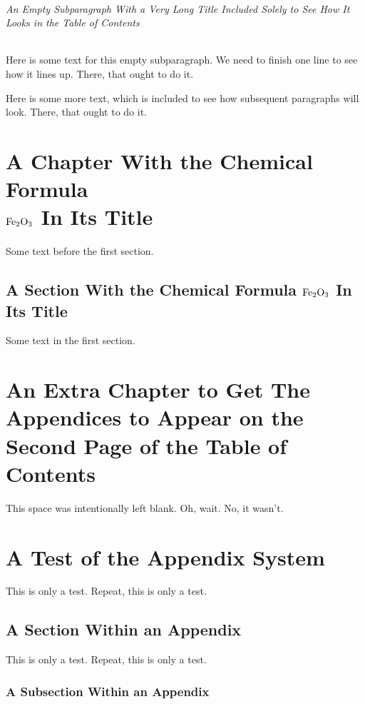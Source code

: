 \documentclass{article}
\begin{document}
\subparagraph{An Empty Subparagraph With a Very Long Title Included Solely to See How It Looks in the Table of Contents}

Here is some text for this empty subparagraph.  We need to finish one line to see how it lines up.  There, that ought to do it.

Here is some more text, which is included to see how subsequent paragraphs will look.  There, that ought to do it.


\chapter{A Chapter With the Chemical Formula%
	\texorpdfstring{\\ $\rm Fe_2 O_3$}{Fe2O3} In Its Title}

Some text before the first section.

\section{A Section With the Chemical Formula 	\texorpdfstring{$\rm Fe_2 O_3$}{Fe2O3} In Its Title}

Some text in the first section.


\chapter{An Extra Chapter to Get The Appendices to Appear on the Second Page of the Table of Contents}

This space was intentionally left blank.  Oh, wait.  No, it wasn't.






\chapter{A Test of the Appendix System}

This is only a test.  Repeat, this is only a test.

\section{A Section Within an Appendix}

This is only a test.  Repeat, this is only a test.

\subsection{A Subsection Within an Appendix}
\end{document}
